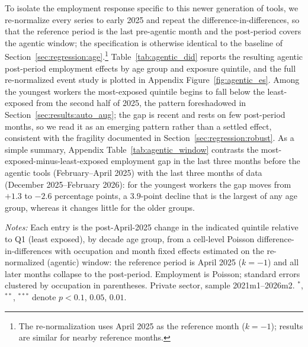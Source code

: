 \documentclass[12pt]{article}
\begin{document}
To isolate the employment response specific to this newer generation of tools, we re-normalize every series to early 2025 and repeat the difference-in-differences, so that the reference period is the last pre-agentic month and the post-period covers the agentic window; the specification is otherwise identical to the baseline of Section~\ref{sec:regression:age}.\footnote{The re-normalization uses April 2025 as the reference month ($k=-1$); results are similar for nearby reference months.} Table~\ref{tab:agentic_did} reports the resulting agentic post-period employment effects by age group and exposure quintile, and the full re-normalized event study is plotted in Appendix Figure~\ref{fig:agentic_es}. Among the youngest workers the most-exposed quintile begins to fall below the least-exposed from the second half of 2025, the pattern foreshadowed in Section~\ref{sec:results:auto_aug}; the gap is recent and rests on few post-period months, so we read it as an emerging pattern rather than a settled effect, consistent with the fragility documented in Section~\ref{sec:regression:robust}. As a simple summary, Appendix Table~\ref{tab:agentic_window} contrasts the most-exposed-minus-least-exposed employment gap in the last three months before the agentic tools (February--April 2025) with the last three months of data (December 2025--February 2026): for the youngest workers the gap moves from $+1.3$ to $-2.6$ percentage points, a $3.9$-point decline that is the largest of any age group, whereas it changes little for the older groups.

\begin{table}[tp]
  \centering
  \caption{Agentic AI: post-period employment effects by AI-exposure quintile and decade age group, private sector.}
  \label{tab:agentic_did}
  
  \begin{minipage}{\textwidth}\footnotesize\textit{Notes:} Each entry is the post-April-2025 change in the indicated quintile relative to Q1 (least exposed), by decade age group, from a cell-level Poisson difference-in-differences with occupation and month fixed effects estimated on the re-normalized (agentic) window: the reference period is April 2025 ($k=-1$) and all later months collapse to the post-period. Employment is Poisson; standard errors clustered by occupation in parentheses. Private sector, sample 2021m1--2026m2. $^{*}$, $^{**}$, $^{***}$ denote $p<0.1$, $0.05$, $0.01$.\end{minipage}
\end{table}
\end{document}
